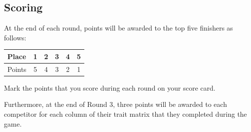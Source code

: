 \documentclass[a6paper, 11pt, parskip=half, DIV=15]{scrartcl}
\begin{document}
\subsection*{Scoring}
At the end of each round, points will be awarded to the top five finishers as follows:

\begin{center}
\begin{tabular}{lccccc}\toprule
Place & 1 & 2 & 3 & 4 & 5 \\\midrule
Points & 5 & 4 & 3 & 2 & 1\\\bottomrule
\end{tabular}
\end{center}

Mark the points that you score during each round on your score card.

Furthermore, at the end of Round 3, three points will be awarded to each competitor for each column of their trait matrix that they completed during the game. 
\end{document}
